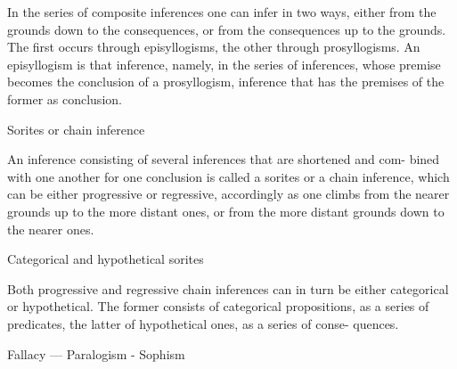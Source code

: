 In the series of composite inferences one can infer in two ways,
either from the grounds down to the consequences, or
from the consequences up to the grounds.
The first occurs through episyllogisms,
the other through prosyllogisms.
An episyllogism is that inference, namely, in the series of inferences,
whose premise becomes the conclusion of a prosyllogism,
inference that has the premises of the former as conclusion.

Sorites or chain inference

An inference consisting of several inferences that are shortened and com-
bined with one another for one conclusion is called a sorites or a chain
inference, which can be either progressive or regressive, accordingly as one
climbs from the nearer grounds up to the more distant ones, or from the
more distant grounds down to the nearer ones.

Categorical and hypothetical sorites

Both progressive and regressive chain inferences can in turn be either
categorical or hypothetical. The former consists of categorical propositions, as a
series of predicates, the latter of hypothetical ones, as a series of conse-
quences.

Fallacy — Paralogism - Sophism


